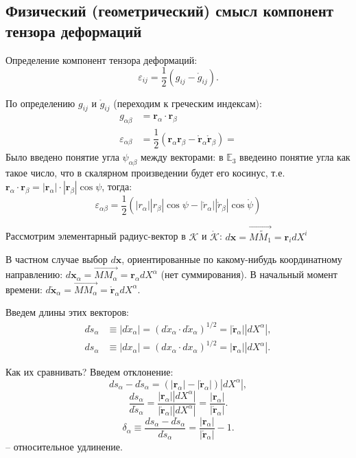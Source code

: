 \subsection{Физический (геометрический) смысл компонент тензора деформаций}

Определение компонент тензора деформаций:
\[
  \varepsilon_{ij} = \dfrac{1}{2} \left( g_{ij} -  \mathring{g}_{ij} \right).
\]

По определению $g_{ij}$ и $\mathring{g}_{ij}$ (переходим к греческим индексам):
\begin{align*}
  g_{\alpha\beta} &= \mathbf{r}_\alpha \cdot \mathbf{r}_\beta \\
  \varepsilon_{\alpha \beta} &= \dfrac{1}{2} \left( \mathbf{r}_\alpha \mathbf{r}_\beta - \mathring{\mathbf{r}}_\alpha \mathring{\mathbf{r}}_\beta \right) 
  = 
\end{align*}
Было введено понятие угла $\psi_{\alpha\beta}$ между векторами:
в $\mathbb{E}_3$ введеино понятие угла как такое число, что в скалярном произведении
будет его косинус, т.е. $\mathbf{r}_\alpha \cdot \mathbf{r}_\beta = |\mathbf{r}_\alpha| \cdot |\mathbf{r}_\beta| \cos \psi$, тогда:
\[
  \varepsilon_{\alpha\beta} = \dfrac{1}{2} \left( |r_\alpha| |r_\beta| \cos \psi - |\mathring{r}_\alpha| |\mathring{r}_\beta| \cos \mathring{\psi} \right) 
\]


Рассмотрим элементарный радиус-вектор в $\mathcal{K}$ и $\mathcal{\mathring{K}}$:
$d\mathbf{x} = \vec{M\tilde M_1} = \mathbf{r}_i dX^i$

В частном случае выбор $d\mathbf{x}$, ориентированные по какому-нибудь координатному направлению:
$d\mathbf{x}_\alpha = \vec{MM_\alpha} = \mathbf{r}_\alpha dX^\alpha$ (нет суммирования).
В начальный момент времени: $d\mathring{\mathbf{x}}_\alpha = \vec{MM_\alpha} = \mathring{\mathbf{r}}_\alpha dX^\alpha$.

Введем длины этих векторов:
\begin{align*}
  d\mathring{s}_\alpha &\equiv |d\mathring{x}_\alpha|
  = (d\mathring{x}_\alpha \cdot d\mathring{x}_\alpha)^{1/2}
  =  |\mathring{\mathbf{r}}_\alpha| |dX^\alpha|, \\
  ds_\alpha &\equiv |dx_\alpha|
  = (dx_\alpha \cdot dx_\alpha)^{1/2}
  =  |\mathbf{r}_\alpha| |dX^\alpha|.
\end{align*}

Как их сравнивать? Введем отклонение:
\[
  ds_\alpha - d\mathring{s}_\alpha = (|\mathbf{r}_\alpha| - |\mathbf{\mathring{r}}_\alpha|) |dX^\alpha|,
\]
\[
  \dfrac{ds_\alpha}{d\mathring{s}_\alpha}
  = \dfrac{|\mathbf{r}_\alpha| |dX^\alpha|}{|\mathbf{\mathring{r}}_\alpha| |dX^\alpha| }
  = \dfrac{|\mathbf{r}_\alpha|}{|\mathbf{\mathring{r}}_\alpha|}.
\]
\[
  \delta_\alpha
  \equiv \dfrac{ds_\alpha - d\mathring{s}_\alpha}{d\mathring{s}_\alpha}
  = \dfrac{|\mathbf{r}_\alpha|}{|\mathbf{\mathring{r}}_\alpha|} - 1.
\]
-- относительное удлинение.

